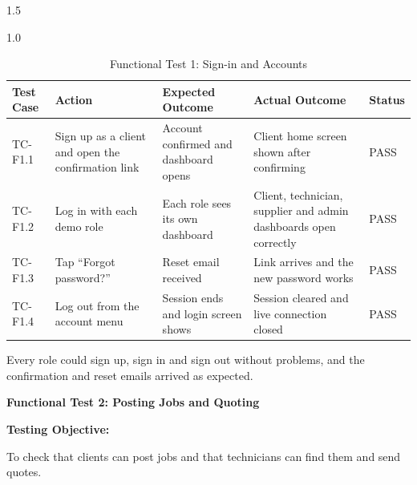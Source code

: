 \documentclass[A4paper,12pt]{report}
\theoremstyle{plain}
\theoremstyle{definition}
\theoremstyle{remark}
\numberwithin{equation}{section}
\begin{document}
\begin{spacing}{1.5}
\begin{table}[H]
\centering
\caption{Functional Test 1: Sign-in and Accounts}
\begin{spacing}{1.0}
{\small
\begin{tabular}{|p{}|p{}|p{}|p{}|p{}|}
\hline
\textbf{Test Case} & \textbf{Action} & \textbf{Expected Outcome} & \textbf{Actual Outcome} & \textbf{Status} \\ \hline
TC-F1.1 & Sign up as a client and open the confirmation link & Account confirmed and dashboard opens & Client home screen shown after confirming & PASS \\ \hline
TC-F1.2 & Log in with each demo role & Each role sees its own dashboard & Client, technician, supplier and admin dashboards open correctly & PASS \\ \hline
TC-F1.3 & Tap ``Forgot password?'' & Reset email received & Link arrives and the new password works & PASS \\ \hline
TC-F1.4 & Log out from the account menu & Session ends and login screen shows & Session cleared and live connection closed & PASS \\ \hline
\end{tabular}}
\end{spacing}
\end{table}

Every role could sign up, sign in and sign out without problems, and the confirmation and reset emails arrived as expected.

\textbf{Functional Test 2: Posting Jobs and Quoting}

\textbf{Testing Objective:}

To check that clients can post jobs and that technicians can find them and send quotes.


\end{spacing}
\end{document}
